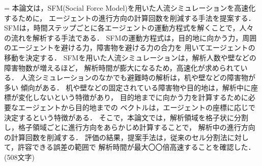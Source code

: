 %
%








%



={
本論文は，SFM(Social Force Model)を用いた人流シミュレーションを高速化するために，
エージェントの進行方向の計算回数を削減する手法を提案する．
SFMは，時間ステップごとに各エージェントの運動方程式を解くことで，人々の流れを解析する手法である．
SFMの運動方程式は，目的地に向かう力，周囲のエージェントを避ける力，障害物を避ける力の合力を
用いてエージェントの移動を決定する．
SFMを用いた人流シミュレーションは，解析人数や壁などの障害物数が増えるほど，
解析時間が膨大になるため，高速化が求められている．
人流シミュレーションのなかでも避難時の解析は，机や壁などの障害物が多い
傾向がある．
机や壁などの固定されている障害物や目的地は，解析中に座標が変化しないという特徴があり，
目的地までに向かう力を計算するために必要なエージェントから目的地までの
ベクトルは，エージェントの座標に応じで決定するという特徴がある．
そこで，本論文では，解析領域を格子状に分割し，格子領域ごとに進行方向をあらかじめ計算することで，
解析中の進行方向の計算回数を削減する．
評価の結果，提案手法は，従来のセル分割法に対して，許容できる誤差の範囲で
解析時間が最大〇〇倍高速することを確認した．
(508文字)
}%

